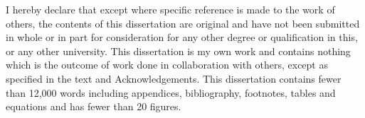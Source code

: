 
\begin{declaration}

I hereby declare that except where specific reference is made to the work of 
others, the contents of this dissertation are original and have not been 
submitted in whole or in part for consideration for any other degree or 
qualification in this, or any other university. This dissertation is my own 
work and contains nothing which is the outcome of work done in collaboration 
with others, except as specified in the text and Acknowledgements. This 
dissertation contains fewer than 12,000 words including appendices, 
bibliography, footnotes, tables and equations and has fewer than 20 figures.


\end{declaration}

